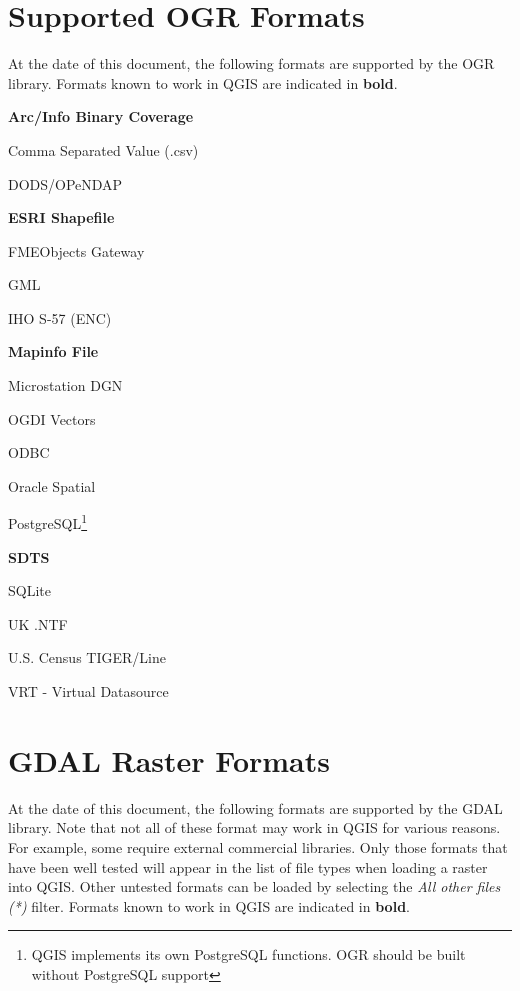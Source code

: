 \documentclass[10pt,english]{article}
\begin{document}
\begin{onehalfspace}
\section{Supported OGR Formats}\label{appdx_ogr} 
At the date of this document, the following formats are supported by the OGR
library. Formats known to work in QGIS are indicated in \textbf{bold}.

\begin{compactitem}
\item \textbf{Arc/Info Binary Coverage}
\item Comma Separated Value (.csv) 
\item DODS/OPeNDAP
\item \textbf{ESRI Shapefile}
\item FMEObjects Gateway
\item GML
\item IHO S-57 (ENC)
\item \textbf{Mapinfo File}
\item Microstation DGN
\item OGDI Vectors
\item ODBC
\item Oracle Spatial
\item PostgreSQL\footnote{QGIS implements its own PostgreSQL functions. OGR should be built without PostgreSQL support}
\item \textbf{SDTS}
\item SQLite
\item UK .NTF
\item U.S. Census TIGER/Line
\item VRT - Virtual Datasource
\end{compactitem}
\section{GDAL Raster Formats}\label{appdx_gdal}
At the date of this document, the following formats are supported by the GDAL
library. Note that not all of these format may work in QGIS for various reasons.
For example, some require external commercial libraries. Only those formats that
have been well tested will appear in the list of file types when loading a
raster into QGIS. Other untested formats can be loaded by selecting the
\textsl{All other files (*)} filter. Formats known to work in QGIS are indicated
in \textbf{bold}.


\end{onehalfspace}
\end{document}
